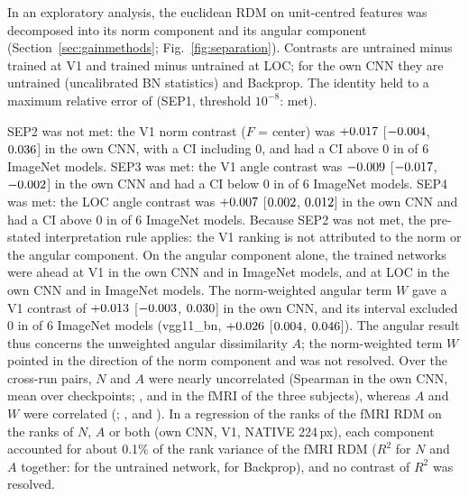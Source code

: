 In an exploratory analysis, the euclidean RDM on unit-centred features was decomposed
into its norm component and its angular component (Section~\ref{sec:gainmethods};
Fig.~\ref{fig:separation}). Contrasts are untrained minus trained at V1 and trained minus
untrained at LOC; for the own CNN they are untrained (uncalibrated BN statistics) and
Backprop. The identity held to a maximum relative error of
\SepOneMaxRelError{} (SEP1, threshold $10^{-8}$: met).

SEP2 was not met: the V1 norm contrast ($F$ = center) was $+0.017$
[$-0.004$, $0.036$] in the own CNN, with a CI
including 0, and had a CI above 0 in \SepTwoModels{} of 6 ImageNet models. SEP3 was met:
the V1 angle contrast was $-0.009$ [$-0.017$,
$-0.002$] in the own CNN and had a CI below 0 in \SepThreeModels{} of 6
ImageNet models. SEP4 was met: the LOC angle contrast was $+0.007$
[$0.002$, $0.012$] in the own CNN and had a CI above 0
in \SepFourModels{} of 6 ImageNet models. Because SEP2 was not met, the pre-stated interpretation rule applies: the V1 ranking is not attributed to the norm or the angular component. On the angular component alone, the trained
networks were ahead at V1 in the own CNN and in \SepThreeModels{} ImageNet models, and
at LOC in the own CNN and in \SepFourModels{} ImageNet models. The norm-weighted angular
term $W$ gave a V1 contrast of $+0.013$ [$-0.003$, $0.030$] in the own
CNN, and its interval excluded 0 in \WAngImnPosModels{} of 6 ImageNet models (vgg11\_bn,
$+0.026$ [$0.004$, $0.046$]). The angular result
thus concerns the unweighted angular dissimilarity $A$; the norm-weighted term $W$ pointed in
the direction of the norm component and was not resolved. Over the cross-run pairs, $N$ and $A$
were nearly uncorrelated (Spearman \WRankNAOwn{} in the own CNN, mean over checkpoints;
\WRankNASubOne, \WRankNASubTwo{} and \WRankNASubThree{} in the fMRI of the three subjects),
whereas $A$ and $W$ were correlated (\WRankAWOwn; \WRankAWSubOne, \WRankAWSubTwo{} and
\WRankAWSubThree). In a regression of the ranks of the fMRI RDM on the ranks of $N$, $A$ or
both (own CNN, V1, NATIVE 224\,px), each component accounted for about 0.1\% of the rank
variance of the fMRI RDM ($R^2$ for $N$ and $A$ together: \WRtwoNARand{} for the untrained
network, \WRtwoNABp{} for Backprop), and no contrast of $R^2$ was resolved.

